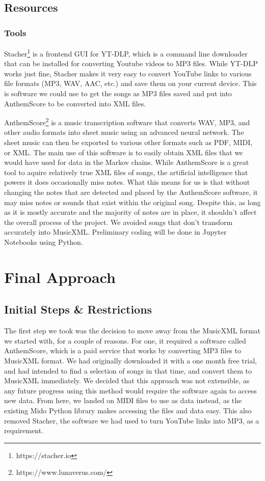 \documentclass{article}
\begin{document}
\subsection{Resources}
\subsubsection{Tools}
Stacher\footnote{https://stacher.io} is a frontend GUI for YT-DLP, which is a command line downloader that can be installed for converting Youtube videos to MP3 files.
While YT-DLP works just fine, Stacher makes it very easy to convert YouTube links to various file formats (MP3, WAV, AAC, etc.) and save them on your current device. This 
is software we could use to get the songs as MP3 files saved and put into AnthemScore to be converted into XML files.

AnthemScore\footnote{https://www.lunaverus.com/} is a music transcription software that converts WAV, MP3, and other audio formats into sheet music using an advanced 
neural network. The sheet music can then be exported to various other formats such as PDF, MIDI, or XML. The main use of this software is to easily obtain XML files that 
we would have used for data in the Markov chains. While AnthemScore is a great tool to aquire relatively true XML files of songs, the artificial intelligence that 
powers it does occasionally miss notes. What this means for us is that without changing the notes that are detected and placed by the AnthemScore software, it may miss notes 
or sounds that exist within the original song. Despite this, as long as it is mostly accurate and the majority of notes are in place, it shouldn't affect the overall process 
of the project. We avoided songs that don't transform accurately into MusicXML. Preliminary coding will be done in Jupyter Notebooks using Python. 


\section{Final Approach}
\subsection{Initial Steps \& Restrictions}
The first step we took was the decision to move away from the MusicXML format we started with, for a couple of reasons. For one, it required a software called AnthemScore, 
which is a paid service that works by converting MP3 files to MusicXML format. We had originally downloaded it with a one month free trial, and had intended to find a 
selection of songs in that time, and convert them to MusicXML immediately. We decided that this approach was not extensible, as any future progress using this method would 
require the software again to access new data. From here, we landed on MIDI files to use as data instead, as the existing Mido Python library makes accessing the files and 
data easy. This also removed Stacher, the software we had used to turn YouTube links into MP3, as a requirement.
\end{document}
